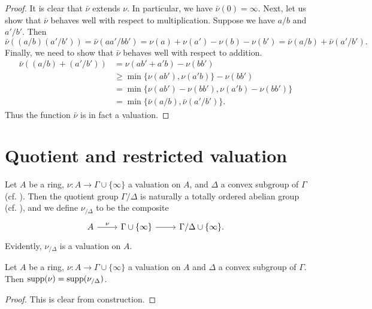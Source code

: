 \begin{proof}
It is clear that $\bar{\nu}$ extends $\nu$. In particular, we have $\bar{\nu}(0) = \infty$. Next, let us show that $\bar{\nu}$ behaves well with respect to multiplication. Suppose we have $a/b$ and $a'/b'$. Then
\[ \bar{\nu}((a/b)(a'/b')) = \bar{\nu}(aa'/bb') = \nu(a) + \nu(a') - \nu(b) - \nu(b') = \bar{\nu}(a/b) + \bar{\nu}(a'/b'). \]
Finally, we need to show that $\bar{\nu}$ behaves well with respect to addition. 
\[ \begin{aligned} \bar{\nu}((a/b) + (a'/b')) &= \nu(ab' + a'b) - \nu(bb') \\
&\geq \min\{ \nu(ab'), \nu(a'b)\} - \nu(bb') \\
&= \min\{ \nu(ab') - \nu(bb'), \nu(a'b) - \nu(bb') \} \\
&= \min\{ \bar{\nu}(a/b), \bar{\nu}(a'/b') \}. \end{aligned} \]
Thus the function $\bar{\nu}$ is in fact a valuation. 

\end{proof}

\section{Quotient and restricted valuation}

\begin{definition}
\label{definition:quotient-valuation}
Let $A$ be a ring, $\nu : A \to \Gamma \cup \{\infty\}$ a valuation on $A$, and $\Delta$ a convex subgroup of $\Gamma$ (cf. ). Then the quotient group $\Gamma/\Delta$ is naturally a totally ordered abelian group (cf. ), and we define $\nu_{/\Delta}$ to be the composite
\[ \begin{tikzcd} A \ar{r}{\nu} & \Gamma \cup \{ \infty\} \ar{r} & \Gamma/\Delta \cup \{\infty\}. \end{tikzcd} \]
Evidently, $\nu_{/\Delta}$ is a valuation on $A$. 
\end{definition}

\begin{lemma} \label{result:support-of-quotient-valuation}
Let $A$ be a ring, $\nu : A \to \Gamma \cup \{\infty\}$ a valuation on $A$ and $\Delta$ a convex subgroup of $\Gamma$. Then $\operatorname{supp}(\nu) = \operatorname{supp}(\nu_{/\Delta})$. 
\end{lemma}

\begin{proof}
This is clear from construction. 
\end{proof}


